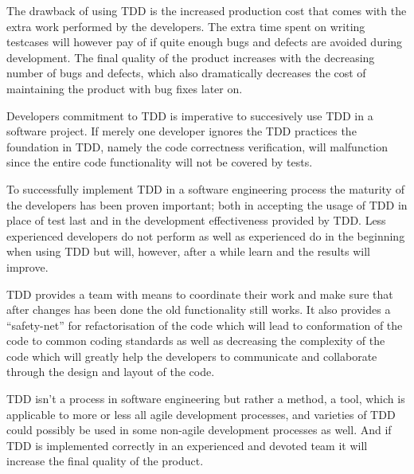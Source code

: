 The drawback of using TDD is the increased production cost that comes with the extra work performed by the developers. The extra time spent on writing testcases will however pay of if quite enough bugs and defects are avoided during development. The final quality of the product increases with the decreasing number of bugs and defects, which also dramatically decreases the cost of maintaining the product with bug fixes later on.

Developers commitment to TDD is imperative to succesively use TDD in a software project. If merely one developer ignores the TDD practices the foundation in TDD, namely the code correctness verification, will malfunction since the entire code functionality will not be covered by tests.

To successfully implement TDD in a software engineering process the maturity of the developers has been proven important; both in accepting the usage of TDD in place of test last and in the development effectiveness provided by TDD.  	
Less experienced developers do not perform as well as experienced do in the beginning when using TDD but will, however, after a while learn and the results will improve.
  	
TDD provides a team with means to coordinate their work and make sure that after changes has been done the old functionality still works. It also provides a ``safety-net'' for refactorisation of the code which will lead to conformation of the code to common coding standards as well as decreasing the complexity of the code which will greatly help the developers to communicate and collaborate through the design and layout of the code.
	  	
TDD isn't a process in software engineering but rather a method, a tool, which is applicable to more or less all agile development processes, and varieties of TDD could possibly be used in some non-agile development processes as well. And if TDD is implemented correctly in an experienced and devoted team it will increase the final quality of the product.  